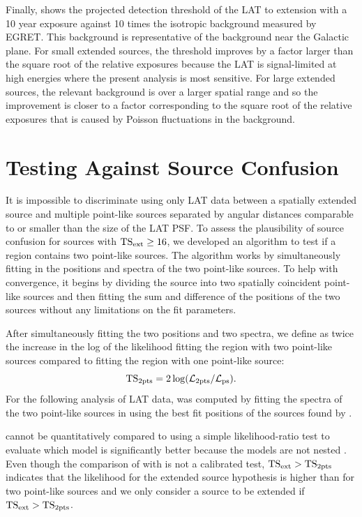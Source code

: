 Finally,  shows the projected
detection threshold of the LAT to extension with a 10 year
exposure against 10 times
the isotropic background measured by EGRET. This background is
representative of the background near the Galactic plane.  For small
extended sources, the threshold improves by a factor larger
than the square root of the relative exposures because the LAT is signal-limited
at high energies where the present analysis is most sensitive. For large
extended sources, the relevant background is over a larger spatial range
and so the improvement is closer to a factor corresponding
to the square root of the relative exposures that is caused by Poisson fluctuations in the background.


\section{Testing Against Source Confusion}

It is impossible to discriminate using only LAT data between a
spatially extended source and multiple point-like sources separated by
angular distances comparable to or smaller than the size of the LAT PSF. 
To assess the plausibility of source confusion for sources with
$\mathrm{TS}_\mathrm{ext}\ge16$, we developed an algorithm to test if a region contains
two point-like sources.  The algorithm works by simultaneously fitting
in \pointlike the positions and spectra of the two point-like sources.
To help with convergence, it begins by dividing the source into two
spatially coincident point-like sources and then fitting the sum and
difference of the positions of the two sources without any limitations
on the fit parameters.

After simultaneously fitting the two positions and two spectra,
we define \tsinc as twice the increase in the log of the likelihood
fitting the region with two point-like sources compared to fitting the
region with one point-like source:
\begin{equation}
  \mathrm{TS}_{\mathrm{2pts}}=2\log(\mathcal{L}_\text{2pts}/\mathcal{L}_\text{ps}).
\end{equation} 
For the following analysis of LAT data, \tsinc was computed
by fitting the spectra of the two point-like sources in \gtlike using the best fit positions
of the sources found by \pointlike.

\tsinc cannot be quantitatively compared to \tsext using a simple
likelihood-ratio test to evaluate which model is significantly better
because the models are not nested \citep{protassov_2002a_statistics-handle}.
Even though the comparison of \tsext with \tsinc is not a calibrated
test, $\mathrm{TS}_\mathrm{ext}>\mathrm{TS}_{\mathrm{2pts}}$ indicates that the likelihood for the extended
source hypothesis is higher than for two point-like sources and we only
consider a source to be extended if $\mathrm{TS}_\mathrm{ext}>\mathrm{TS}_{\mathrm{2pts}}$.

